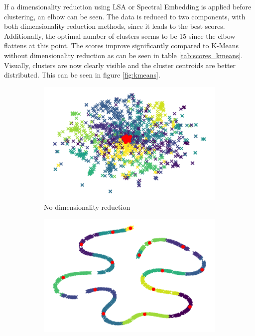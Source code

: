 If a dimensionality reduction using LSA or Spectral Embedding is applied before clustering, an elbow can be seen.
The data is reduced to two components, with both dimensionality reduction methods, since it leads to the best scores.
Additionally, the optimal number of clusters seems to be 15 since the elbow flattens at this point.
The scores improve significantly compared to K-Means without dimensionality reduction as can be seen in table \ref{tab:scores_kmeans}. Visually, clusters are now clearly visible and the cluster centroids are better distributed.
This can be seen in figure \ref{fig:kmeans}.

\begin{figure}
\centering
\begin{subfigure}{.3\textwidth}
    \centering
    \includegraphics[width=\linewidth]{imgs/kmeans.png}
    \caption{No dimensionality reduction}
    \label{fig:kmeans_no_dim}
\end{subfigure}
\begin{subfigure}{.3\textwidth}
  \centering
  \includegraphics[width=\linewidth]{imgs/kmeans_lsa.png}

\end{subfigure}
\end{figure}
